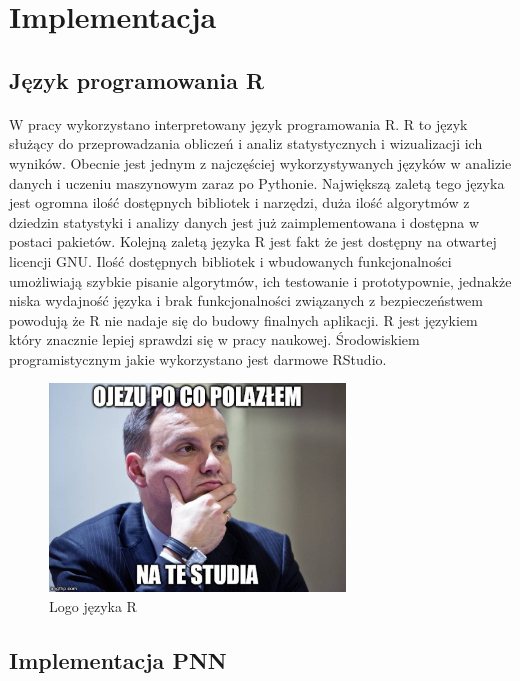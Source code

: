 \documentclass[a4paper,12pt,twoside]{article}
\begin{document}
\newpage
\section{Implementacja}

\subsection{Język programowania R}
\paragraph{}
W pracy  wykorzystano interpretowany język programowania R. R to język służący do przeprowadzania obliczeń i analiz statystycznych i wizualizacji ich wyników. Obecnie jest jednym z najczęściej wykorzystywanych języków w analizie danych i uczeniu maszynowym zaraz po Pythonie. Największą zaletą tego języka jest ogromna ilość dostępnych bibliotek i narzędzi, duża ilość algorytmów z dziedzin statystyki i analizy danych jest już zaimplementowana i dostępna w postaci pakietów. Kolejną zaletą języka R jest fakt że jest dostępny na otwartej licencji GNU. Ilość dostępnych bibliotek i wbudowanych funkcjonalności umożliwiają szybkie pisanie algorytmów, ich testowanie i prototypownie, jednakże niska wydajność języka i brak funkcjonalności związanych z bezpieczeństwem powodują że R nie nadaje się do budowy finalnych aplikacji. R jest językiem który znacznie lepiej sprawdzi się w pracy naukowej. Środowiskiem programistycznym jakie wykorzystano jest darmowe RStudio.
\begin{figure}[h]
    \centering
    \includegraphics[width=0.7\textwidth]{dudel.jpg}
    \caption{Logo języka R}
\end{figure}
 \newpage
\subsection{Implementacja PNN}
\end{document}
